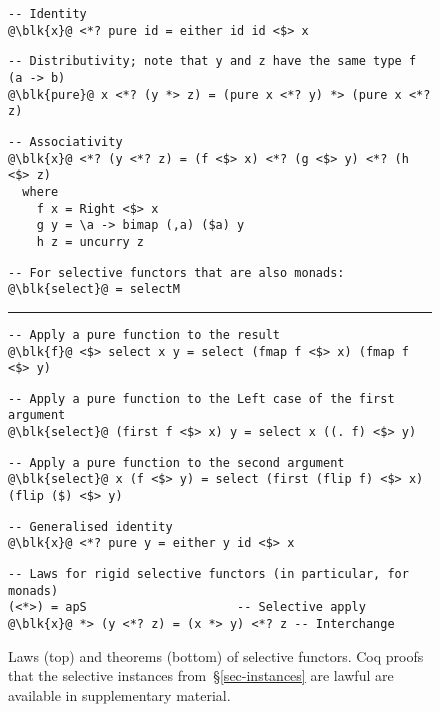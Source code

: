 {\begin{figure}
\begin{verbatim}
-- Identity
@\blk{x}@ <*? pure id = either id id <$> x
\end{verbatim}
\vspace{1mm}
\begin{verbatim}
-- Distributivity; note that y and z have the same type f (a -> b)
@\blk{pure}@ x <*? (y *> z) = (pure x <*? y) *> (pure x <*? z)
\end{verbatim}
\vspace{1mm}
\begin{verbatim}
-- Associativity
@\blk{x}@ <*? (y <*? z) = (f <$> x) <*? (g <$> y) <*? (h <$> z)
  where
    f x = Right <$> x
    g y = \a -> bimap (,a) ($a) y
    h z = uncurry z
\end{verbatim}
\vspace{1mm}
\begin{verbatim}
-- For selective functors that are also monads:
@\blk{select}@ = selectM
\end{verbatim}
\vspace{2mm}
\hrule
\vspace{2mm}
\begin{verbatim}
-- Apply a pure function to the result
@\blk{f}@ <$> select x y = select (fmap f <$> x) (fmap f <$> y)
\end{verbatim}
\vspace{1mm}
\begin{verbatim}
-- Apply a pure function to the Left case of the first argument
@\blk{select}@ (first f <$> x) y = select x ((. f) <$> y)
\end{verbatim}
\vspace{1mm}
\begin{verbatim}
-- Apply a pure function to the second argument
@\blk{select}@ x (f <$> y) = select (first (flip f) <$> x) (flip ($) <$> y)
\end{verbatim}
\vspace{1mm}
\begin{verbatim}
-- Generalised identity
@\blk{x}@ <*? pure y = either y id <$> x
\end{verbatim}
\vspace{1mm}
\begin{verbatim}
-- Laws for rigid selective functors (in particular, for monads)
(<*>) = apS                     -- Selective apply
@\blk{x}@ *> (y <*? z) = (x *> y) <*? z -- Interchange
\end{verbatim}
\vspace{-2mm}
\caption{Laws (top) and theorems (bottom) of selective functors. Coq proofs that
the selective instances from~\S\ref{sec-instances} are lawful are available in
supplementary material.}
\label{fig-laws}
\vspace{-3mm}
\end{figure}

}
